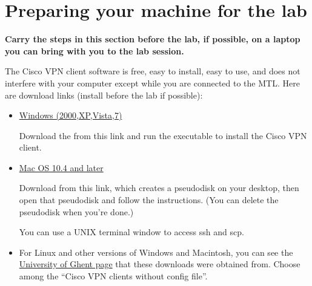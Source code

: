 \documentclass[letterpaper,10pt,openany,oneside]{sphinxmanual}
\begin{document}
\chapter{Preparing your machine for the lab}
\label{Preparement/Preparement:preparing-your-machine-for-the-lab}\label{Preparement/Preparement:putty}\label{Preparement/Preparement::doc}
\textbf{Carry the steps in this section before the lab, if possible, on a laptop you can bring with you to the lab session.}

The Cisco VPN client software is free, easy to install, easy to use, and does not interfere with your computer except while you are connected to the MTL. Here are download links (install before the lab if possible):
\begin{itemize}
\item {} 
\href{http://www.cs.stolaf.edu/pub/vpnclient-win-msi-5.0.06.0160-k9.exe}{Windows (2000,XP,Vista,7)}

Download the from this link and run the executable to install the Cisco VPN client.

\item {} 
\href{http://helpdesk.ugent.be/vpn/download/vpnclient-darwin-4.9.01.0080-universal-k9-5-10.dmg}{Mac OS 10.4 and later}

Download from this link, which creates a pseudodisk on your desktop, then open that pseudodisk and follow the instructions. (You can delete the pseudodisk when you're done.)

You can use a UNIX terminal window to access ssh and scp.

\item {} 
For Linux and other versions of Windows and Macintosh, you can see the \href{http://helpdesk.ugent.be/vpn/en/akkoord.php}{University of Ghent page} that these downloads were obtained from. Choose among the ``Cisco VPN clients without config file''.

\end{itemize}
\end{document}
